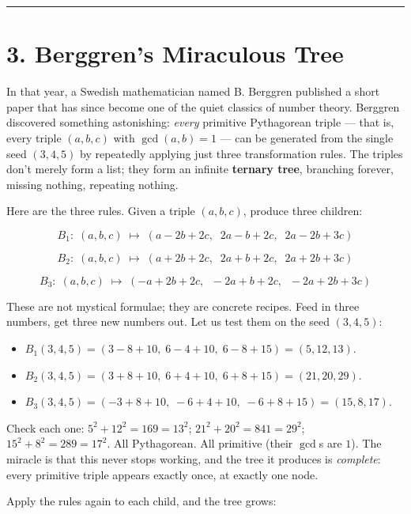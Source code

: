 \documentclass[11pt,openany]{book}
\theoremstyle{definition}
\theoremstyle{plain}
\theoremstyle{remark}
\begin{document}
\bigskip\noindent\rule{\textwidth}{0.4pt}\bigskip


\section{3. Berggren's Miraculous Tree}


In that year, a Swedish mathematician named B. Berggren published a short paper that has since become one of the quiet classics of number theory. Berggren discovered something astonishing: \textit{every} primitive Pythagorean triple — that is, every triple $(a, b, c)$ with $\gcd(a, b) = 1$ — can be generated from the single seed $(3, 4, 5)$ by repeatedly applying just three transformation rules. The triples don't merely form a list; they form an infinite \textbf{ternary tree}, branching forever, missing nothing, repeating nothing.

Here are the three rules. Given a triple $(a, b, c)$, produce three children:

$$B_1:\; (a, b, c) \;\longmapsto\; (a - 2b + 2c,\;\; 2a - b + 2c,\;\; 2a - 2b + 3c)$$

$$B_2:\; (a, b, c) \;\longmapsto\; (a + 2b + 2c,\;\; 2a + b + 2c,\;\; 2a + 2b + 3c)$$

$$B_3:\; (a, b, c) \;\longmapsto\; (-a + 2b + 2c,\;\; -2a + b + 2c,\;\; -2a + 2b + 3c)$$

These are not mystical formulae; they are concrete recipes. Feed in three numbers, get three new numbers out. Let us test them on the seed $(3, 4, 5)$:

\begin{itemize}
\item $B_1(3,4,5) = (3 - 8 + 10,\; 6 - 4 + 10,\; 6 - 8 + 15) = (5, 12, 13)$.
\item $B_2(3,4,5) = (3 + 8 + 10,\; 6 + 4 + 10,\; 6 + 8 + 15) = (21, 20, 29)$.
\item $B_3(3,4,5) = (-3 + 8 + 10,\; -6 + 4 + 10,\; -6 + 8 + 15) = (15, 8, 17)$.
\end{itemize}

Check each one: $5^2 + 12^2 = 169 = 13^2$; $21^2 + 20^2 = 841 = 29^2$; $15^2 + 8^2 = 289 = 17^2$. All Pythagorean. All primitive (their $\gcd$s are $1$). The miracle is that this never stops working, and the tree it produces is \textit{complete}: every primitive triple appears exactly once, at exactly one node.

Apply the rules again to each child, and the tree grows:
\end{document}
